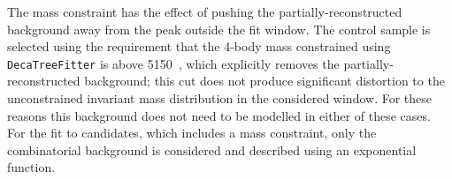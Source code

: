 The \jpsi mass constraint has the effect of pushing the partially-reconstructed background away from 
the peak outside the fit window. The \jpsi control sample is selected using the requirement that the 4-body 
mass constrained using \verb!DecaTreeFitter! is above 5150~\mevc, which explicitly removes
the partially-reconstructed background; this cut does not produce significant distortion to the
unconstrained invariant mass distribution in the considered window. 
For these reasons this background does not need to be modelled in either of these cases.
%
%
%
%
%
%
%
%
%
%
For the fit to \BdToKstPsiee candidates, which includes a \psitwos mass constraint, only the combinatorial background is considered
and described using an exponential function.
%

